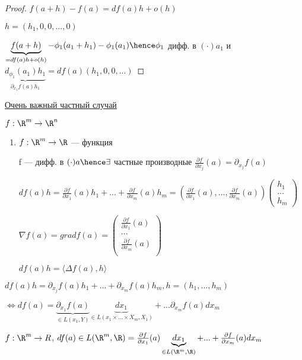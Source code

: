 \begin{proof}
    $f(a + h) - f(a) = df(a)h + o(h)$ 

    $h = (h_1, 0, 0, ..., 0)$

    $\underbrace{f(a + h)}_{ = df(a)h + o(h)} - \phi_1(a_1 + h_1) - \phi_1(a_1) \hence \phi_1$ дифф. в $(\cdot) a_1$ и 
    $\underbrace{d_{\phi_1}(a_1)h_1}_{\partial_{x_1} f(a)h_1} = df(a)(h_1, 0, 0, ...)$  
\end{proof}

\underline{Очень важный частный случай}

$f : \R ^ m \to \R^n$

\begin{enumerate}
    

    \item $f : \R ^ m \to \R$ --- функция
    
    f --- дифф. в $(\cdot)a \hence \exists $ частные производные $\frac{\partial f}{\partial {x_j}}(a) = \partial _{x_j}f(a)$

    $df(a)h = \frac{\partial f}{\partial x_1}(a)h_1 + ... + \frac{\partial f}{\partial x_m}(a)h_m = \left( \frac{\partial f}{\partial x_1}(a), ... , \frac{\partial f}{\partial x_m}(a)\right) \begin{pmatrix}
        h_1\\
        ...\\
        h_m
    \end{pmatrix}$

    \begin{definition}
        $ \nabla f(a) = grad f(a) = \begin{pmatrix}
            \frac{\partial f}{\partial x_1}(a)\\
            ...\\
            \frac{\partial f}{\partial x_m}(a)\\
        \end{pmatrix}$

        $df(a)h = \langle \Delta f(a), h \rangle$
    \end{definition}
\end{enumerate}


\begin{remark}
    $df(a)h = \partial_{x_j}f(a)h_1 + ... + \partial_{x_m}f(a)h_m, h = (h_1, ..., h_m)$ 
    
    $\Longleftrightarrow df(a) = \underbrace{\partial_{x_1}f(a)}_{\in L(x_1, Y)} \underbrace{dx_1}_{\in L(x_1 \times ... \times X_m, X_1)} + ... \partial_{x_m}f(a)dx_m$
    
    $f : \R^ m \to R$, $df(a) \in L(\R ^ m, \R) = \frac{\partial f}{\partial x_1}(a) \underbrace{dx_1}_{\in L(\R^m, \R)} + ... + \frac{\partial f}{\partial x_m}(a) dx_m$
\end{remark}

